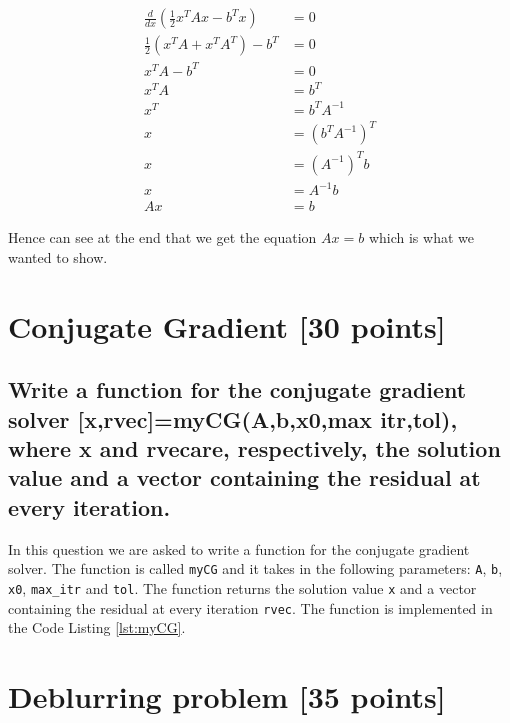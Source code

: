 \documentclass[unicode,11pt,a4paper,oneside,numbers=endperiod,openany]{scrartcl}
\begin{document}
\begin{align}
    \frac{d}{dx} \left( \frac{1}{2} x^T Ax - b^Tx \right) & = 0                           \\
    \frac{1}{2} \left( x^T A + x^T A^T \right) - b^T      & = 0                           \\
    x^T A - b^T                                           & = 0                           \\
    x^T A                                                 & = b^T                         \\
    x^T                                                   & = b^T A^{-1}                  \\
    x                                                     & = \left( b^T A^{-1} \right)^T \\
    x                                                     & = \left( A^{-1} \right)^T b   \\
    x                                                     & = A^{-1} b                    \\
    Ax                                                    & = b
\end{align}

Hence can see at the end that we get the equation $Ax = b$ which is what we wanted to show.

\section{Conjugate Gradient [30 points]}

\subsection{Write a function for the conjugate gradient solver [x,rvec]=myCG(A,b,x0,max itr,tol), where x and rvecare, respectively, the solution value and a vector containing the residual at every iteration.}

In this question we are asked to write a function for the conjugate gradient solver. The function is called \texttt{myCG} and it takes in the following parameters: \texttt{A}, \texttt{b}, \texttt{x0}, \texttt{max\_itr} and \texttt{tol}. The function returns the solution value \texttt{x} and a vector containing the residual at every iteration \texttt{rvec}. The function is implemented in the Code Listing \ref{lst:myCG}.

\section{Deblurring problem [35 points]}
\end{document}
